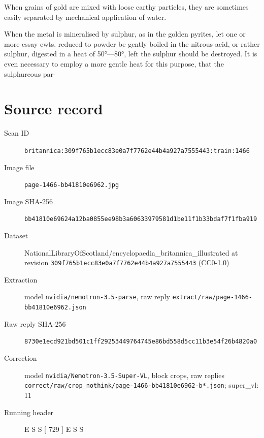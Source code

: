 \documentclass{article}
\begin{document}
When grains of gold are mixed with loose earthy particles, they are sometimes easily separated by mechanical application of water.

When the metal is mineralised by sulphur, as in the golden pyrites, let one or more essay ewts. reduced to powder be gently boiled in the nitrous acid, or rather sulphur, digested in a heat of 50°—80°, left the sulphur should be destroyed. It is even necessary to employ a more gentle heat for this purpose, that the sulphureous par-


\section*{Source record}
\begin{description}
\item[Scan ID] \texttt{britannica:309f765b1ecc83e0a7f7762e44b4a927a7555443:train:1466}
\item[Image file] \texttt{page-1466-bb41810e6962.jpg}
\item[Image SHA-256] \texttt{bb41810e69624a12ba0855ee98b3a60633979581d1be11f1b33bdaf7f1fba919}
\item[Dataset] NationalLibraryOfScotland/encyclopaedia\_britannica\_illustrated at revision \texttt{309f765b1ecc83e0a7f7762e44b4a927a7555443} (CC0-1.0)
\item[Extraction] model \texttt{nvidia/nemotron-3.5-parse}, raw reply \texttt{extract/raw/page-1466-bb41810e6962.json}
\item[Raw reply SHA-256] \texttt{8730e1ecd921bd501c1ff29253449764745e86bd558d5cc11b3e54f26b4820a0}
\item[Correction] model \texttt{nvidia/Nemotron-3.5-Super-VL}, block crops, raw replies \texttt{correct/raw/crop\_nothink/page-1466-bb41810e6962-b*.json}; super\_vl: 11
\item[Running header] E S S [ 729 ] E S S
\end{description}
\end{document}
